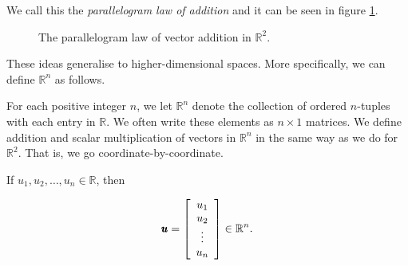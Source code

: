 We call this the \textit{parallelogram law of addition }and it can be seen in figure \ref{fig:parallelogram-law}.

\begin{figure}[h]
    \centering
    \caption{The parallelogram law of vector addition in $\mathbb{R}^2$.}
    \label{fig:parallelogram-law}
\end{figure}

These ideas generalise to higher-dimensional spaces. More specifically, we can define $\mathbb{R}^n$ as follows.

\begin{definition}
    For each positive integer $n$, we let $\mathbb{R}^n$ denote the collection of ordered $n$-tuples with each entry in $\mathbb{R}$. We often write these elements as $n \times 1$ matrices. We define addition and scalar multiplication of vectors in $\mathbb{R}^n$ in the same way as we do for $\mathbb{R}^2$. That is, we go coordinate-by-coordinate.
\end{definition}

\begin{example}
    If $u_1, u_2, \ldots, u_n \in \mathbb{R}$, then

    \[
    \pmb{u} = \left[\begin{array}{c}
    u_1 \\
    u_2 \\
    \vdots \\
    u_n
    \end{array}\right] \in \mathbb{R}^n.
    \]
     
\end{example}

